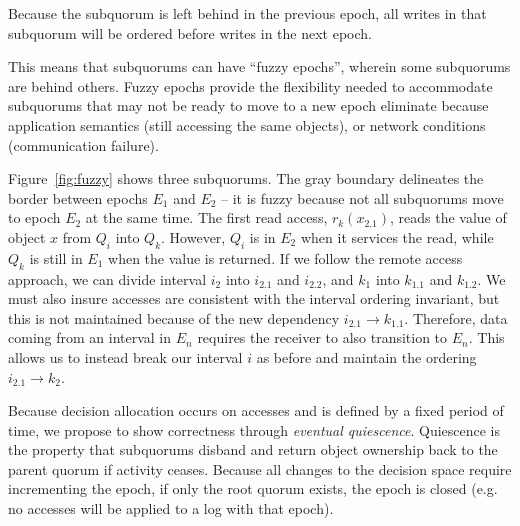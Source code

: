 
Because the subquorum is left behind in the previous epoch, all writes in that subquorum
will be ordered before writes in the next epoch.

This means that subquorums can have ``fuzzy epochs'', wherein some subquorums are behind
others.
Fuzzy epochs provide the flexibility needed to accommodate subquorums that may not be
ready to move to a new epoch eliminate because application semantics (still accessing the
same objects), or network conditions (communication failure).

Figure~\ref{fig:fuzzy} shows three subquorums.
The gray boundary delineates the border between epochs $E_1$ and $E_2$ -- it is fuzzy
because not all subquorums move to epoch $E_2$ at the same time.
The first read access, $r_k(x_{2.1})$, reads the value of object $x$ from $Q_i$ into
$Q_k$.
However, $Q_i$ is in $E_2$ when it services the read, while $Q_k$ is still in $E_1$ when
the value is returned.
If we follow the remote access approach, we can divide interval $i_2$ into $i_{2.1}$ and
$i_{2.2}$, and $k_1$ into $k_{1.1}$ and $k_{1.2}$.
We must also insure accesses are consistent with the interval ordering invariant, but
this is not maintained because of the new dependency $i_{2.1} \rightarrow k_{1.1}$.
Therefore, data coming from an interval in $E_n$ requires the receiver to also transition
to $E_n$. This allows us to instead break our interval $i$ as before and maintain the
ordering $i_{2.1} \rightarrow k_2$.


Because decision allocation occurs on accesses and is defined by a fixed period of time,
we propose to show correctness through \emph{eventual quiescence}.
Quiescence is the property that subquorums disband and return object ownership
back to the parent quorum if activity ceases.
Because all changes to the decision space require incrementing the epoch, if only the
root quorum exists, the epoch is closed (e.g. no accesses will be applied to a log with
that epoch).

